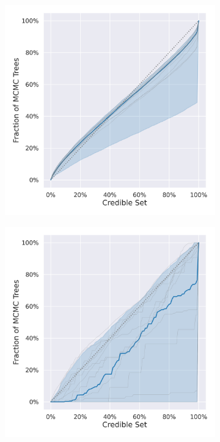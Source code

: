 \documentclass[10pt,letterpaper]{article}
\begin{document}
\begin{figure}
	\begin{subfigure}[b]{0.4\textwidth}
		\centering
		\includegraphics[width=\textwidth]{figures/yule-200-ccd1-credible-sets-Last Divergence (Gamma), Branches (Gamma).png}
	\end{subfigure}
	\begin{subfigure}[b]{0.4\textwidth}
		\centering
		\includegraphics[width=\textwidth]{figures/bio-ccd1-credible-sets-Height (LogNormal), Ratios (Beta).png}
	\end{subfigure}


\end{figure}
\end{document}
